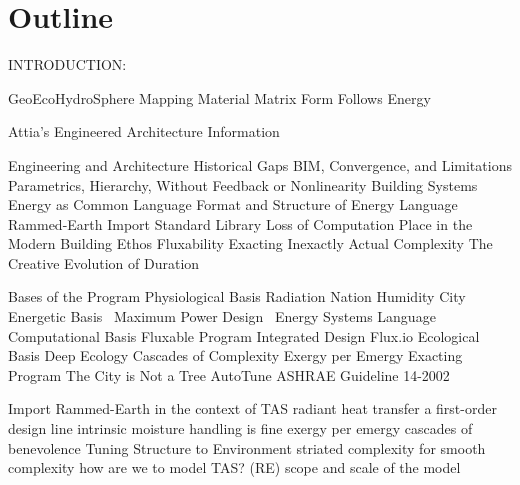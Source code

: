 \section{Outline}

INTRODUCTION:

\begin{outline}

\1 GeoEcoHydroSphere Mapping
\1 Material Matrix
\1 Form Follows Energy


\1 Attia's Engineered Architecture
  \2 Information



\1 Engineering and Architecture
  \2 Historical Gaps
  \2 BIM, Convergence, and Limitations
    \3 Parametrics, Hierarchy, Without Feedback or Nonlinearity
\1 Building Systems
  \2 Energy as Common Language
  \2 Format and Structure of Energy Language
\1 Rammed-Earth
  \2 Import Standard Library
  \2 Loss of Computation
  \2 Place in the Modern Building Ethos
\1 Fluxability
  \2 Exacting Inexactly
  \2 Actual Complexity
  \2 The Creative Evolution of Duration
\end{outline}












\begin{outline}
\1 Bases of the Program
  \2 Physiological Basis
    \3 Radiation Nation
    \3 Humidity City
  \2 Energetic Basis
    \ Maximum Power Design
    \ Energy Systems Language
  \2 Computational Basis
    \3 Fluxable Program
      \4 Integrated Design
        \4 Flux.io
  \2 Ecological Basis
    \3 Deep Ecology
    \3 Cascades of Complexity
    \3 Exergy per Emergy
    \3 Exacting Program
      \4 The City is Not a Tree
      \4 AutoTune
      \4 ASHRAE Guideline 14-2002



    \2 Import Rammed-Earth in the context of TAS
      \3 radiant heat transfer a first-order design line
      \3 intrinsic moisture handling is fine
      \3 exergy per emergy
      \3 cascades of benevolence
    \2 Tuning Structure to Environment
      \3 striated complexity for smooth complexity
      \3 how are we to model TAS? (RE)
      \3 scope and scale of the model
    \3


\end{outline}


